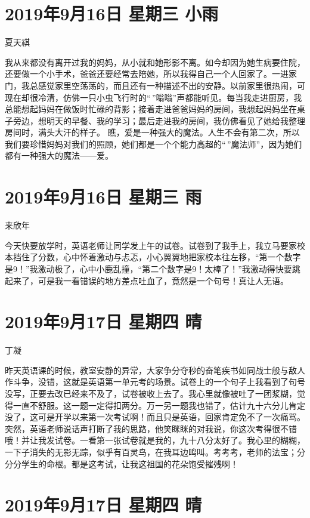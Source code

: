 \section{2019年9月16日 星期三 小雨}

夏天祺

我从来都没有离开过我的妈妈，从小就和她形影不离。如今却因为她生病要住院，还要做一个小手术，爸爸还要经常去陪她，所以我得自己一个人回家了。一进家门，我总感觉家里空荡荡的，而且还有一种描述不出的安静。以前家里很热闹，可现在却很冷清，仿佛一只小虫飞行时的``\,''嗡嗡''声都能听见。每当我走进厨房，我总能想起妈妈在做饭时忙碌的背影；接着走进爸爸妈妈的房间，我想起妈妈坐在桌子旁边，想明天的早餐、我的学习；最后走进我的房间，我仿佛看见了她给我整理房间时，满头大汗的样子。
瞧，爱是一种强大的魔法。人生不会有第二次，所以我们要珍惜妈妈对我们的照顾，她们都是一个个能力高超的``\,''魔法师''，因为她们都有一种强大的魔法------爱。

\section{2019年9月16日 星期三 雨}

来欣年

今天快要放学时，英语老师让同学发上午的试卷。试卷到了我手上，我立马要家校本挡住了分数，心中怀着激动与忐忑，小心翼翼地把家校本往左移，``第一个数字是9！''我激动极了，心中小鹿乱撞，``第二个数字是9！太棒了！''我激动得快要跳起来了，可是我一看错误的地方差点吐血了，竟然是一个句号！真让人无语。

\section{2019年9月17日 星期四 晴}

丁凝

昨天英语课的时候，教室安静的异常，大家争分夺秒的奋笔疾书如同战士般与敌人作斗争，没错，这就是英语第一单元考的场景。试卷上的一个句子上我看到了句号没写，正要去改已经来不及了，试卷被收上去了。我心里就像被吐了一团浆糊，觉得一直不舒服。这一题一定得扣两分。万一另一题我也错了，估计九十六分儿肯定没了，这可是开学以来第一次考试啊！而且只是英语，回家肯定免不了一次痛骂。突然，英语老师说话声打断了我的思路，他笑眯眯的对我说，你这次考得很不错哦！并让我发试卷。一看第一张试卷就是我的，九十八分太好了。我心里的糊糊，一下子消失的无影无踪，似乎有百灵鸟，在我耳边鸣叫。考考考，老师的法宝；分分分学生的命根。都是这考试，让我这祖国的花朵饱受摧残啊！

\section{2019年9月17日 星期四 晴}

